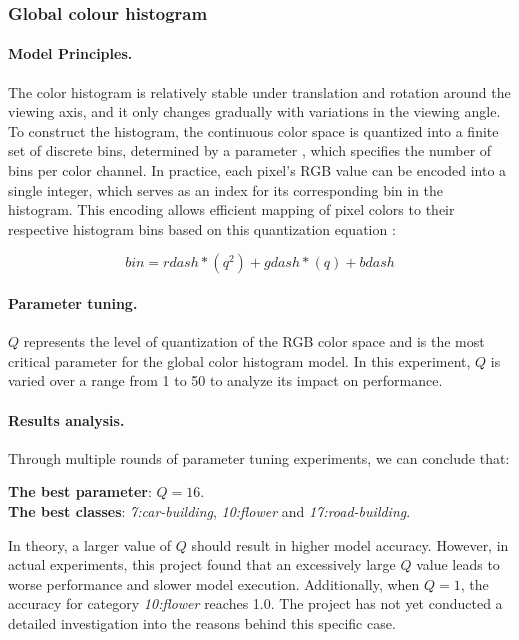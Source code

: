\documentclass{article}
\begin{document}
\subsubsection{Global colour histogram}

\paragraph{Model Principles.}

The color histogram is relatively stable under translation and rotation around the viewing axis, and it only changes gradually with variations in the viewing angle\citep{ComputerVision}. To construct the histogram, the continuous color space is quantized into a finite set of discrete bins, determined by a parameter , which specifies the number of bins per color channel. In practice, each pixel’s RGB value can be encoded into a single integer, which serves as an index for its corresponding bin in the histogram. This encoding allows efficient mapping of pixel colors to their respective histogram bins based on this quantization equation \citep{EEE3032}: 

\begin{equation}
\label{eqn:color-histogram}
bin = rdash*(q^2) + gdash*(q) + bdash
\end{equation}

\paragraph{Parameter tuning.}

$Q$ represents the level of quantization of the RGB color space and is the most critical parameter for the global color histogram model. In this experiment, $Q$ is varied over a range from 1 to 50 to analyze its impact on performance.

\paragraph{Results analysis.}
Through multiple rounds of parameter tuning experiments, we can conclude that:

\noindent \textbf{The best parameter}: $Q = 16$. \\
\textbf{The best classes}: \textit{7:car-building}, \textit{10:flower} and \textit{17:road-building}.

In theory, a larger value of $Q$ should result in higher model accuracy. However, in actual experiments, this project found that an excessively large $Q$ value leads to worse performance and slower model execution. Additionally, when $Q = 1$, the accuracy for category \textit{10:flower} reaches 1.0. The project has not yet conducted a detailed investigation into the reasons behind this specific case.
\end{document}
